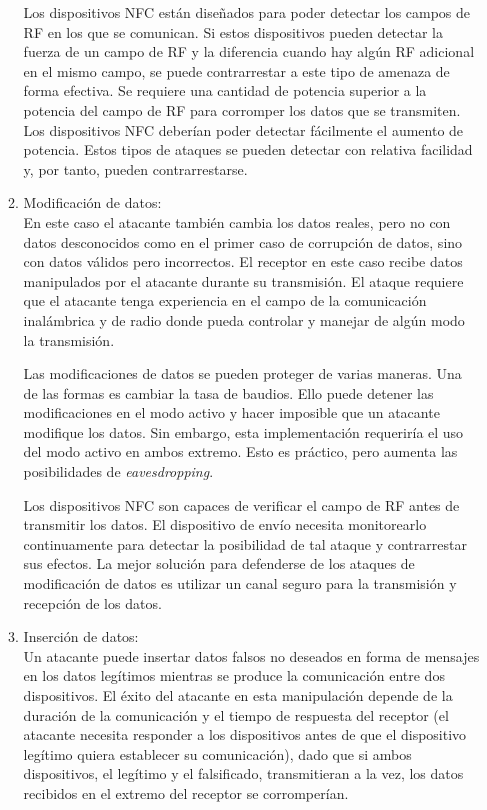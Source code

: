 \documentclass[12pt,a4paper,onecolumn,oneside]{report}
\begin{document}
\begin{enumerate}
\begin{enumerate}
Los dispositivos NFC están diseñados para poder detectar los campos de RF en los que se comunican. Si estos dispositivos pueden detectar la fuerza de un campo de RF y la diferencia cuando hay algún RF adicional en el mismo campo, se puede contrarrestar a este tipo de amenaza de forma efectiva. Se requiere una cantidad de potencia superior a la potencia del campo de RF para corromper los datos que se transmiten. Los dispositivos NFC deberían poder detectar fácilmente el aumento de potencia. Estos tipos de ataques se pueden detectar con relativa facilidad y, por tanto, pueden contrarrestarse.

\item Modificación de datos:\\
En este caso el atacante también cambia los datos reales, pero no con datos desconocidos como en el primer caso de corrupción de datos, sino con datos válidos pero incorrectos. El receptor en este caso recibe datos manipulados por el atacante durante su transmisión. El ataque requiere que el atacante tenga experiencia en el campo de la comunicación inalámbrica y de radio donde pueda controlar y manejar de algún modo la transmisión.

Las modificaciones de datos se pueden proteger de varias maneras. Una de las formas es cambiar la tasa de baudios. Ello puede detener las modificaciones en el modo activo y hacer imposible que un atacante modifique los datos. Sin embargo, esta implementación requeriría el uso del modo activo en ambos extremo. Esto es práctico, pero aumenta las posibilidades de \textit{eavesdropping}.

Los dispositivos NFC son capaces de verificar el campo de RF antes de transmitir los datos. El dispositivo de envío necesita monitorearlo continuamente para detectar la posibilidad de tal ataque y contrarrestar sus efectos. La mejor solución para defenderse de los ataques de modificación de datos es utilizar un canal seguro para la transmisión y recepción de los datos.

\item Inserción de datos:\\
Un atacante puede insertar datos falsos no deseados en forma de mensajes en los datos legítimos mientras se produce la comunicación entre dos dispositivos. El éxito del atacante en esta manipulación depende de la duración de la comunicación y el tiempo de respuesta del receptor (el atacante necesita responder a los dispositivos antes de que el dispositivo legítimo quiera establecer su comunicación), dado que si ambos dispositivos, el legítimo y el falsificado, transmitieran a la vez, los datos recibidos en el extremo del receptor se corromperían. 


\end{enumerate}
\end{enumerate}
\end{document}
